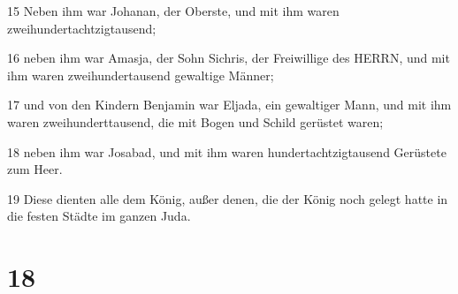 \par 15 Neben ihm war Johanan, der Oberste, und mit ihm waren zweihundertachtzigtausend;
\par 16 neben ihm war Amasja, der Sohn Sichris, der Freiwillige des HERRN, und mit ihm waren zweihundertausend gewaltige Männer;
\par 17 und von den Kindern Benjamin war Eljada, ein gewaltiger Mann, und mit ihm waren zweihunderttausend, die mit Bogen und Schild gerüstet waren;
\par 18 neben ihm war Josabad, und mit ihm waren hundertachtzigtausend Gerüstete zum Heer.
\par 19 Diese dienten alle dem König, außer denen, die der König noch gelegt hatte in die festen Städte im ganzen Juda.

\chapter{18}

